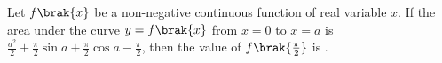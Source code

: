 \iffalse
    \title{Assignment}
    \author{EE24BTECH11009}
    \section{xe}
    \chapter{2021}
  \fi
\item Let $f\brak{x}$ be a non-negative continuous function of real variable $x$. If the area under the curve $y = f\brak{x}$ from $x = 0$ to $x = a$ is $\frac{a^2}{2} + \frac{\pi}{2}\sin a + \frac{\pi}{2}\cos a - \frac{\pi}{2}$, then the value of $f\brak{\frac{\pi}{2}}$ is \underline{\hspace{1cm}}.


